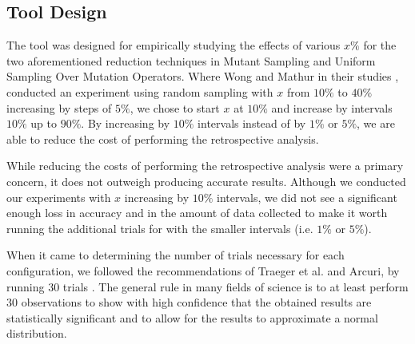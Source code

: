 \subsection{Tool Design}

The \mr tool was designed for empirically studying the effects of various $x\%$ for
the two aforementioned reduction techniques in Mutant Sampling and Uniform Sampling Over Mutation Operators.
Where Wong and Mathur in their studies \cite{mathur1994empirical}, \cite{wong1993mutation} conducted
an experiment using random sampling with $x$ from $10\%$ to $40\%$ increasing by steps of $5\%$, we
chose to start $x$ at $10\%$ and increase by intervals $10\%$ up to $90\%$. By increasing by $10\%$ intervals instead of
by $1\%$ or $5\%$, we are able to reduce the cost of performing the retrospective analysis.

While reducing the costs of performing the retrospective analysis were a primary concern, it does not
outweigh producing accurate results. Although we conducted our experiments with $x$ increasing by
$10\%$ intervals, we did not see a significant enough loss in accuracy and in the amount of data collected to make
it worth running the additional trials for with the smaller intervals (i.e. $1\%$ or $5\%$).

When it came to determining the number of trials necessary for each configuration, we followed
the recommendations of Traeger et al. and Arcuri, by running 30 trials \cite{traeger2008nine, arcuri2014hitchhiker}.
The general rule in many fields of science is to at least perform 30 observations to show with high confidence
that the obtained results are statistically significant and to allow for the results to approximate a normal
distribution.

